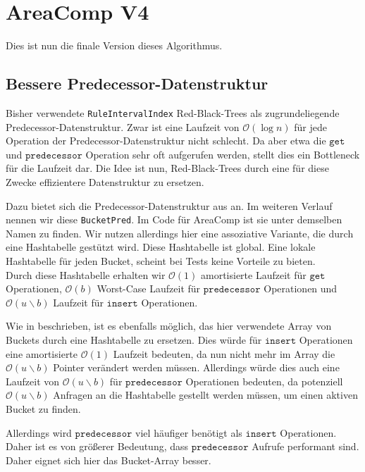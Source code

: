 \section{AreaComp V4}

Dies ist nun die finale Version dieses Algorithmus. 

\subsection{Bessere Predecessor-Datenstruktur}

Bisher verwendete \texttt{RuleIntervalIndex} Red-Black-Trees als zugrundeliegende Predecessor-Datenstruktur. Zwar ist eine Laufzeit von $\mathcal{O}(\log n)$ für jede Operation der Predecessor-Datenstruktur nicht schlecht. Da aber etwa die $\texttt{get}$ und $\texttt{predecessor}$ Operation sehr oft aufgerufen werden, stellt dies ein Bottleneck für die Laufzeit dar.
Die Idee ist nun, Red-Black-Trees durch eine für diese Zwecke effizientere Datenstruktur zu ersetzen.

Dazu bietet sich die Predecessor-Datenstruktur aus \cite{dinklage_engineering_2021} an. Im weiteren Verlauf nennen wir diese \texttt{BucketPred}. Im Code für AreaComp ist sie unter demselben Namen zu finden. Wir nutzen allerdings hier eine assoziative Variante, die durch eine Hashtabelle gestützt wird. Diese Hashtabelle ist global. 
Eine lokale Hashtabelle für jeden Bucket, scheint bei Tests keine Vorteile zu bieten.\\
Durch diese Hashtabelle erhalten wir $\mathcal{O}(1)$ amortisierte Laufzeit für $\texttt{get}$ Operationen, $\mathcal{O}(b)$ Worst-Case Laufzeit für $\texttt{predecessor}$ Operationen und $\mathcal{O}(u \backslash b)$ Laufzeit für $\texttt{insert}$ Operationen. 

Wie in \cite{dinklage_engineering_2021} beschrieben, ist es ebenfalls möglich, das hier verwendete Array von Buckets durch eine Hashtabelle zu ersetzen. Dies würde für $\texttt{insert}$ Operationen eine amortisierte $\mathcal{O}(1)$ Laufzeit bedeuten, da nun nicht mehr im Array die $\mathcal{O}(u \backslash b)$ Pointer verändert werden müssen. Allerdings würde dies auch eine Laufzeit von $\mathcal{O}(u \backslash b)$ für $\texttt{predecessor}$ Operationen bedeuten, da potenziell $\mathcal{O}(u \backslash b)$ Anfragen an die Hashtabelle gestellt werden müssen, um einen aktiven Bucket zu finden. 

Allerdings wird $\texttt{predecessor}$ viel häufiger benötigt als $\texttt{insert}$ Operationen. Daher ist es von größerer Bedeutung, dass $\texttt{predecessor}$ Aufrufe performant sind. Daher eignet sich hier das Bucket-Array besser.

